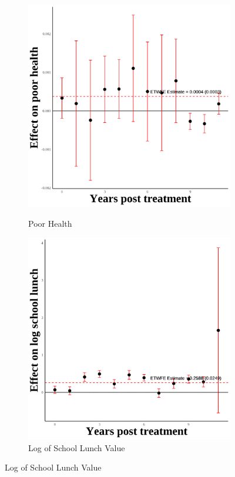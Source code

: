 \documentclass[12pt,english]{article}
\begin{document}
\pagebreak


\begin{figure}[H]
  \caption{Effect of Immigration Enforcement on Children's Outcomes: First Generation}
  \centering

  \begin{subfigure}[b]{0.3\textwidth}
    \centering
    \caption{Poor Health}
    \includegraphics[width=\linewidth]{figures/plot09-poor_health_event_study-first.png}
    \label{fig:poor-health-first}
  \end{subfigure}
  \hfill
  \begin{subfigure}[b]{0.3\textwidth}
    \centering
    \caption{Log of School Lunch Value}
    \includegraphics[width=\linewidth]{figures/plot10-ln_schl_lunch_event_study-first.png}

\end{subfigure}
\end{figure}
\end{document}

